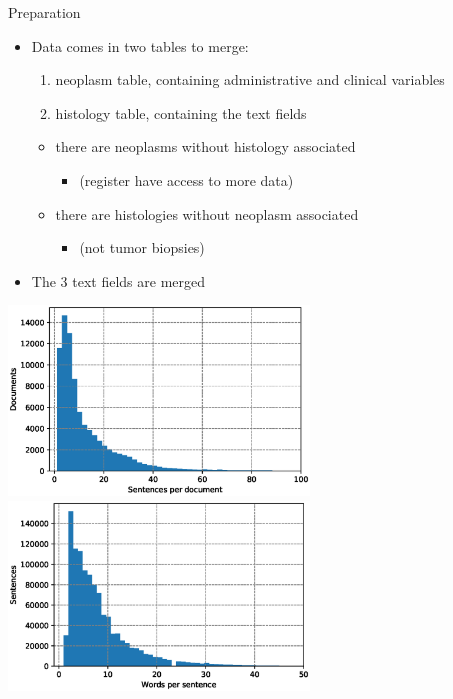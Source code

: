 \begin{frame}{Preparation}
  \begin{itemize}
  \item Data comes in \alert{two} tables to merge:
    \begin{enumerate}
    \item neoplasm table, containing administrative and clinical variables
    \item histology table, containing the text fields
    \end{enumerate}
    \begin{itemize}
    \item there are neoplasms without histology associated
      \begin{itemize}
      \item (register have access to more data)
      \end{itemize}
    \item there are histologies without neoplasm associated
      \begin{itemize}
      \item (not tumor biopsies) 
      \end{itemize}
    \end{itemize}
  \item The 3 text fields are \alert{merged}
  \end{itemize}
\end{frame}

\begin{frame}
  \centering
  \includegraphics[width=0.6\textwidth]{img/sentPerDoc.eps}
  \includegraphics[width=0.6\textwidth]{img/wordPerSent.eps}
\end{frame}


